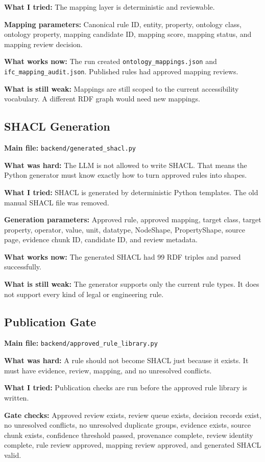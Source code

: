 \documentclass[11pt,a4paper]{article}
\begin{document}
\textbf{What I tried:}
The mapping layer is deterministic and reviewable.

\textbf{Mapping parameters:}
Canonical rule ID, entity, property, ontology class, ontology property, mapping candidate ID, mapping score, mapping status, and mapping review decision.

\textbf{What works now:}
The run created \texttt{ontology\_mappings.json} and \texttt{ifc\_mapping\_audit.json}. Published rules had approved mapping reviews.

\textbf{What is still weak:}
Mappings are still scoped to the current accessibility vocabulary. A different RDF graph would need new mappings.

\subsection{SHACL Generation}
\textbf{Main file:} \texttt{backend/generated\_shacl.py}

\textbf{What was hard:}
The LLM is not allowed to write SHACL. That means the Python generator must know exactly how to turn approved rules into shapes.

\textbf{What I tried:}
SHACL is generated by deterministic Python templates. The old manual SHACL file was removed.

\textbf{Generation parameters:}
Approved rule, approved mapping, target class, target property, operator, value, unit, datatype, NodeShape, PropertyShape, source page, evidence chunk ID, candidate ID, and review metadata.

\textbf{What works now:}
The generated SHACL had 99 RDF triples and parsed successfully.

\textbf{What is still weak:}
The generator supports only the current rule types. It does not support every kind of legal or engineering rule.

\subsection{Publication Gate}
\textbf{Main file:} \texttt{backend/approved\_rule\_library.py}

\textbf{What was hard:}
A rule should not become SHACL just because it exists. It must have evidence, review, mapping, and no unresolved conflicts.

\textbf{What I tried:}
Publication checks are run before the approved rule library is written.

\textbf{Gate checks:}
Approved review exists, review queue exists, decision records exist, no unresolved conflicts, no unresolved duplicate groups, evidence exists, source chunk exists, confidence threshold passed, provenance complete, review identity complete, rule review approved, mapping review approved, and generated SHACL valid.
\end{document}
